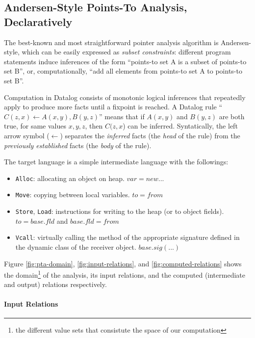 \subsection{Andersen-Style Points-To Analysis, Declaratively}

The best-known and most straightforward pointer analysis algorithm is
Andersen-style, which can be easily expressed as \textit{subset
  constraints}: different program statements induce inferences of the
form ``points-to set A is a subset of points-to set B'', or,
computationally, ``add all elements from points-to set A to points-to
set B''.


Computation in Datalog consists of monotonic logical inferences that
repeatedly apply to produce more facts until a fixpoint is reached. A
Datalog rule ``$C(z,x) \gets A(x,y), B(y,z)$'' means that if $A(x,y)$
and $B(y,z)$ are both true, for same values $x,y,z$, then $C(z,x$) can
be inferred. Syntatically, the left arrow symbol ($\gets$) separates
the \textit{inferred} facts (the \textit{head} of the rule) from the
\textit{previously established} facts (the \textit{body} of the rule).


The target language is a simple intermediate language with the
followings:

\begin{itemize}
\item \texttt{Alloc}: allocating an object on heap. $ var = new ... $
\item \texttt{Move}: copying between local variables. $ to = from $
\item \texttt{Store}, \texttt{Load}: instructions for writing to the
  heap (or to object fields). $ to = base.fld $ and
  $ base.fld = from $
\item \texttt{Vcall}: virtually calling the method of the appropriate
  signature defined in the dynamic class of the receiver object.
  $ base.sig(...)$
\end{itemize}


Figure \ref{fig:pta-domain}, \ref{fig:input-relations}, and
\ref{fig:computed-relations} shows the domain\footnote{the different
  value sets that consistute the space of our computation} of the
analysis, its input relations, and the computed (intermediate and
output) relations respectively.

\paragraph{Input Relations}

